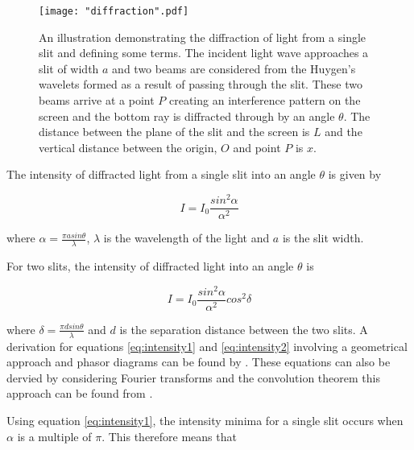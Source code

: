 \documentclass{article}
\begin{document}
\begin{figure}[h]
\centering
\texttt{[image: "diffraction".pdf]}
\caption{An illustration demonstrating the diffraction of light from a single slit and defining some terms. The incident light wave approaches a slit of width $a$ and two beams are considered from the Huygen's wavelets \cite{Book01} formed as a result of passing through the slit. These two beams arrive at a point $P$ creating an interference pattern on the screen and the bottom ray is diffracted through by an angle $\theta$. The distance between the plane of the slit and the screen is $L$ and the vertical distance between the origin, $O$ and point $P$ is $x$. }
\label{fig:diffraction}
\end{figure}

\vspace{2mm}
\noindent
The intensity of diffracted light from a single slit into an angle $\theta$ \cite{Paper02} is given by

\begin{equation}
\label{eq:intensity1}
I = I_0 \frac{sin^2{\alpha}}{\alpha^2}
\end{equation}

\vspace{2mm}
\noindent
where $\alpha = \frac{\pi asin{\theta}}{\lambda}$, $\lambda$ is the wavelength of the light and $a$ is the slit width.

\vspace{2mm}
\noindent
For two slits, the intensity of diffracted light into an angle $\theta$ \cite{Paper02} is

\begin{equation}
\label{eq:intensity2}
I = I_0 \frac{sin^2{\alpha}}{\alpha^2} cos^2{\delta}
\end{equation}

\vspace{2mm}
\noindent
where $\delta = \frac{\pi dsin{\theta}}{\lambda}$ and $d$ is the separation distance between the two slits. A derivation for equations \eqref{eq:intensity1} and \eqref{eq:intensity2} involving a geometrical approach and phasor diagrams can be found by \cite{Book01}. These equations can also be dervied by considering Fourier transforms and the convolution theorem this approach can be found from \cite{Web03}.

\vspace{2mm}
\noindent
Using equation \eqref{eq:intensity1}, the intensity minima for a single slit occurs when $\alpha$ is a multiple of $\pi$. This therefore means that
\end{document}
